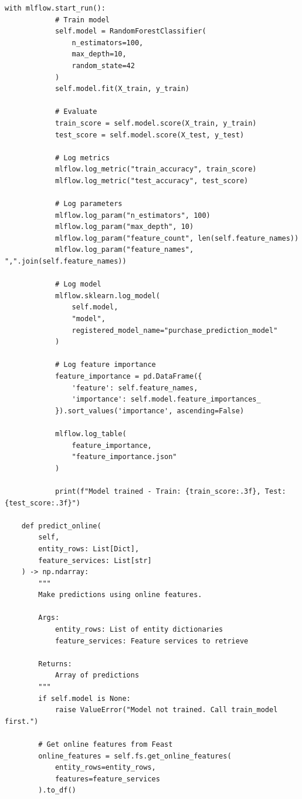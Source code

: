 \begin{lstlisting}[style=python, caption=End-to-end pipeline integration]
        with mlflow.start_run():
            # Train model
            self.model = RandomForestClassifier(
                n_estimators=100,
                max_depth=10,
                random_state=42
            )
            self.model.fit(X_train, y_train)

            # Evaluate
            train_score = self.model.score(X_train, y_train)
            test_score = self.model.score(X_test, y_test)

            # Log metrics
            mlflow.log_metric("train_accuracy", train_score)
            mlflow.log_metric("test_accuracy", test_score)

            # Log parameters
            mlflow.log_param("n_estimators", 100)
            mlflow.log_param("max_depth", 10)
            mlflow.log_param("feature_count", len(self.feature_names))
            mlflow.log_param("feature_names", ",".join(self.feature_names))

            # Log model
            mlflow.sklearn.log_model(
                self.model,
                "model",
                registered_model_name="purchase_prediction_model"
            )

            # Log feature importance
            feature_importance = pd.DataFrame({
                'feature': self.feature_names,
                'importance': self.model.feature_importances_
            }).sort_values('importance', ascending=False)

            mlflow.log_table(
                feature_importance,
                "feature_importance.json"
            )

            print(f"Model trained - Train: {train_score:.3f}, Test: {test_score:.3f}")

    def predict_online(
        self,
        entity_rows: List[Dict],
        feature_services: List[str]
    ) -> np.ndarray:
        """
        Make predictions using online features.

        Args:
            entity_rows: List of entity dictionaries
            feature_services: Feature services to retrieve

        Returns:
            Array of predictions
        """
        if self.model is None:
            raise ValueError("Model not trained. Call train_model first.")

        # Get online features from Feast
        online_features = self.fs.get_online_features(
            entity_rows=entity_rows,
            features=feature_services
        ).to_df()


\end{lstlisting}
